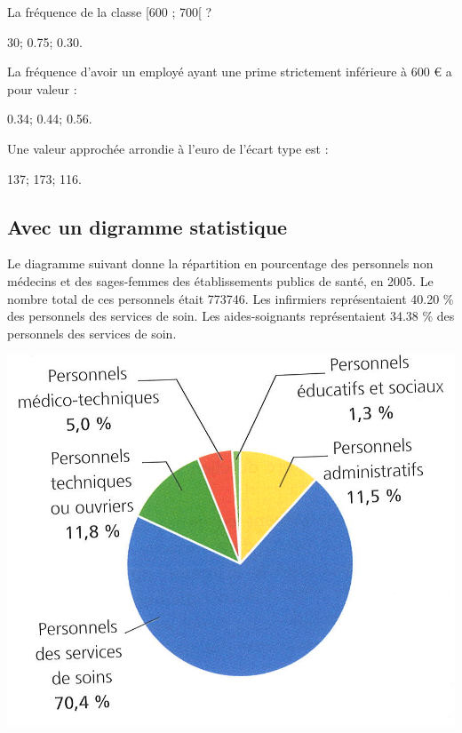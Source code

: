 \begin{questions}
	\question La fréquence de la classe [600 ; 700[ ?
	
	\begin{oneparchoices}
		\choice \num{30};
		\choice \num{0.75};
		\CorrectChoice \num{0.30}.
	\end{oneparchoices} 

	\question La fréquence d'avoir un employé ayant une prime strictement inférieure à 600 € a pour valeur :
	
	\begin{oneparchoices}
		\choice \num{0.34};
		\CorrectChoice \num{0.44};
		\choice \num{0.56}.
	\end{oneparchoices} 

	\question Une valeur approchée arrondie à l'euro de l'écart type est :
	
	\begin{oneparchoices}
		\choice \num{137};
		\choice \num{173};
		\CorrectChoice \num{116}.
	\end{oneparchoices} 
\end{questions}  

\subsection{Avec un digramme statistique}

\begin{multicols}{2}
	Le diagramme suivant donne la répartition en pourcentage des personnels non médecins et des sages-femmes des établissements publics de santé, en 2005.
	Le nombre total de ces personnels était \num{773746}.
	Les infirmiers représentaient \num{40.20} \% des personnels des services de soin. Les aides-soignants représentaient \num{34.38} \% des personnels des services de soin.
	
	
	
	\begin{center}
		\includegraphics[scale=0.9]{img/repartition}
	\end{center}
	
\end{multicols}


